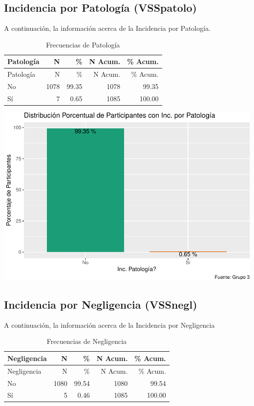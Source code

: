\documentclass[
]{article}
\begin{document}
\subsection{Incidencia por Patología
(VSSpatolo)}\label{incidencia-por-patologuxeda-vsspatolo}

A continuación, la información acerca de la Incidencia por Patología.

\begin{longtable}[]{@{}lrrrr@{}}
\caption{Frecuencias de Patología}\tabularnewline
\toprule\noalign{}
Patología & N & \% & N Acum. & \% Acum. \\
\midrule\noalign{}
\endfirsthead
\toprule\noalign{}
Patología & N & \% & N Acum. & \% Acum. \\
\midrule\noalign{}
\endhead
\bottomrule\noalign{}
\endlastfoot
No & 1078 & 99.35 & 1078 & 99.35 \\
Sí & 7 & 0.65 & 1085 & 100.00 \\
\end{longtable}

\includegraphics{Info_Dinix_02_files/figure-latex/30_VSSpatolo-1.pdf}

\subsection{Incidencia por Negligencia
(VSSnegl)}\label{incidencia-por-negligencia-vssnegl}

A continuación, la información acerca de la Incidencia por Negligencia

\begin{longtable}[]{@{}lrrrr@{}}
\caption{Frecuencias de Negligencia}\tabularnewline
\toprule\noalign{}
Negligencia & N & \% & N Acum. & \% Acum. \\
\midrule\noalign{}
\endfirsthead
\toprule\noalign{}
Negligencia & N & \% & N Acum. & \% Acum. \\
\midrule\noalign{}
\endhead
\bottomrule\noalign{}
\endlastfoot
No & 1080 & 99.54 & 1080 & 99.54 \\
Sí & 5 & 0.46 & 1085 & 100.00 \\
\end{longtable}
\end{document}
